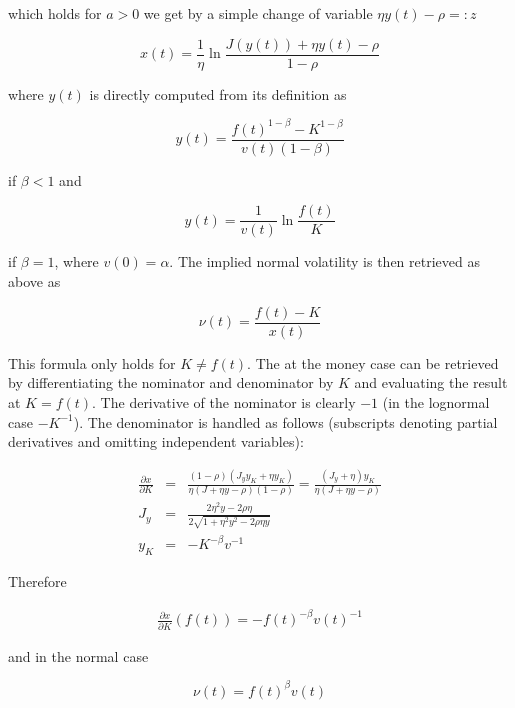 \documentclass{amsart}
\theoremstyle{plain}
\numberwithin{equation}{section}
\begin{document}
which holds for $a>0$ we get by a simple change of variable $\eta y(t) - \rho =: z$

\begin{equation}
x(t) = \frac{1}{\eta} \ln \frac{J(y(t))+\eta y(t) - \rho}{1-\rho}
\end{equation}

where $y(t)$ is directly computed from its definition as

\begin{equation}
y(t) = \frac{f(t)^{1-\beta}-K^{1-\beta}}{v(t)(1-\beta)}
\end{equation}

if $\beta < 1$ and

\begin{equation}
y(t) = \frac{1}{v(t)} \ln \frac{f(t)}{K}
\end{equation}

if $\beta=1$, where $v(0)=\alpha$. The implied normal volatility is then retrieved as above as

\begin{equation}
\nu(t) = \frac{f(t)-K}{x(t)}
\end{equation}

This formula only holds for $K \neq f(t)$. The at the money case can be retrieved by differentiating the nominator
and denominator by $K$ and evaluating the result at $K=f(t)$. The derivative of the nominator is clearly $-1$ (in the
lognormal case $-K^{-1}$). The denominator is handled as follows (subscripts denoting partial derivatives and omitting
independent variables):

\begin{eqnarray}\label{sabrder}
\frac{\partial x}{\partial K} &=& \frac{ (1-\rho)(J_y y_K + \eta y_K) }{ \eta (J + \eta y - \rho)(1-\rho) } = 
\frac{(J_y+\eta)y_K}{\eta(J+\eta y-\rho)} \\
J_y &=& \frac{2\eta^2y-2\rho\eta}{2\sqrt{1+\eta^2y^2-2\rho\eta y}} \\
y_K &=& -K^{-\beta}v^{-1}
\end{eqnarray}

Therefore

\begin{eqnarray}\label{sabrdxdk}
\frac{\partial x}{\partial K} \left( f(t) \right) = -f(t)^{-\beta} v(t)^{-1} 
\end{eqnarray}

and in the normal case

\begin{equation}
\nu(t) = f(t)^{\beta} v(t)
\end{equation}
\end{document}
